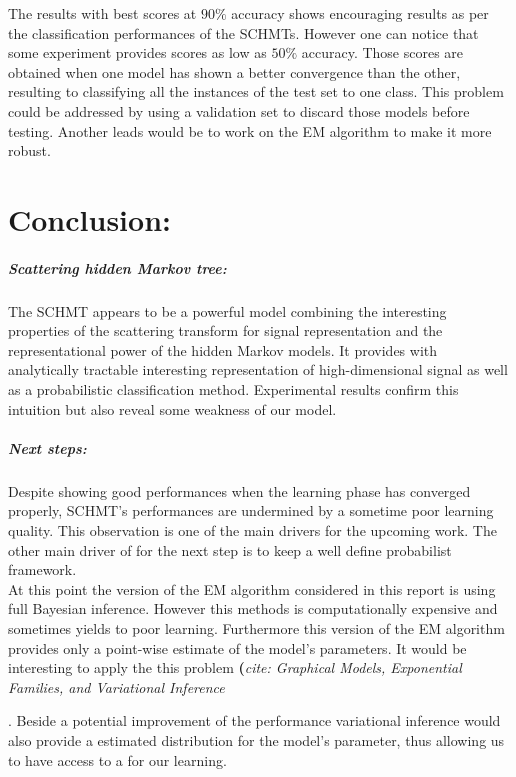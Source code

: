 \documentclass[a4paper,11pt]{report}
\begin{document}
{		The results with best scores at $90\%$ accuracy shows encouraging results as per the classification performances of the SCHMTs. However one can notice that some experiment provides scores as low as $50\%$ accuracy. Those scores are obtained when one model has shown a better convergence than the other, resulting to classifying all the instances of the test set to one class. This problem could be addressed by using a validation set to discard those models before testing. Another leads would be to work on the EM algorithm to make it more robust.
		
		
\chapter{Conclusion:}

  \paragraph{Scattering hidden Markov tree:}
    The SCHMT appears to be a powerful model combining the interesting properties of the scattering transform for signal representation and the representational power of the hidden Markov models. It provides with analytically tractable interesting representation of high-dimensional signal as well as a probabilistic classification method. Experimental results confirm this intuition but also reveal some weakness of our model.\\
    
    
    
    
  \paragraph{Next steps:}
		Despite showing good performances when the learning phase has converged properly, SCHMT's performances are undermined by a sometime poor learning quality. This observation is one of the main drivers for the upcoming work. The other main driver of for the next step is to keep a well define probabilist framework.\\
		
		At this point the version of the EM algorithm considered in this report is using full Bayesian inference. However this methods is computationally expensive and sometimes yields to poor learning. Furthermore this version of the EM algorithm provides only a point-wise estimate of the model's parameters. It would be interesting to apply  the this problem \textbf(\textit{cite: Graphical Models, Exponential Families, and Variational Inference}}. Beside a potential improvement of the performance variational inference would also provide a estimated distribution for the model's parameter, thus allowing us to have access to a  for our learning.\\
		
\end{document}
